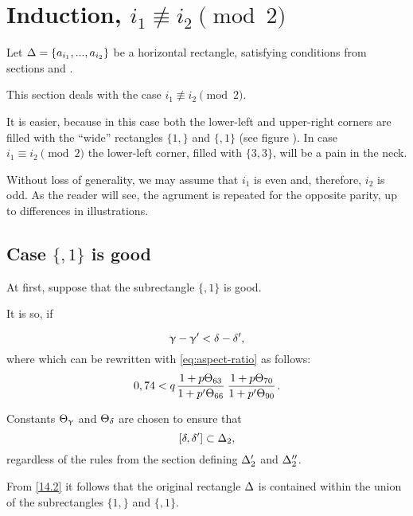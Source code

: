 \section{Induction, $i_1 \not\equiv i_2 \pmod 2$}

Let $\Delta = \{ a_{i_1}, ..., a_{i_2}\}$ be a horizontal rectangle,
satisfying conditions from sections  and .

This section deals with the case $i_1 \not\equiv i_2 \pmod 2$.

It is easier, because in this case both the lower-left and upper-right corners
are filled with the ``wide'' rectangles $\{1,\}$ and $\{,1\}$ (see figure ).
In case $i_1 \equiv i_2 \pmod 2$ the lower-left corner, filled with $\{3,3\}$,
will be a pain in the neck.

Without loss of generality, we may assume that $i_1$ is even and, therefore, $i_2$ is odd.
As the reader will see, the agrument is repeated for the opposite parity,
up to differences in illustrations.

\subsection{Case $\{, 1\}$ is good}

At first, suppose that the subrectangle $\{,1\}$ is good.

It is so, if


\begin{equation*}
	\upgamma - \upgamma' < \delta - \delta',
\end{equation*}
where
which can be rewritten with \ref{eq:aspect-ratio} as follows:
\begin{equation}\label{14.2}
	0,74 < q \up{63}{66} \up{70}{90}.
\end{equation}

Constants $\Theta_{\upgamma}$ and $\Theta_{\delta}$ are chosen to ensure that
\begin{equation*}
	\left[ \delta, \delta' \right] \subset \Delta_2,
\end{equation*}
regardless of the rules from the section  defining $\Delta_2'$ and $\Delta_2''$.

From \ref{14.2} it follows that the original rectangle $\Delta$ is contained
within the union of the subrectangles $\{1,\}$ and $\{,1\}$.



